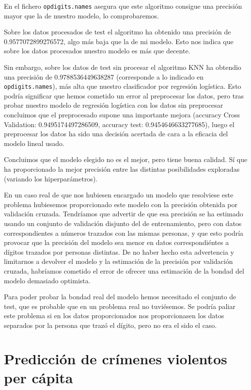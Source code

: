 \documentclass[a4]{article}
\begin{document}
En el fichero \texttt{opdigits.names} asegura que este algoritmo
consigue una precisión mayor que la de nuestro modelo, lo
comprobaremos.

Sobre los datos procesados de test el algoritmo ha obtenido una
precisión de 0.9577072899276572, algo más baja que la de mi modelo.
Esto nos indica que sobre los datos procesados nuestro modelo es más
que decente.

Sin embargo, sobre los datos de test sin procesar el algoritmo KNN ha
obtendio una precisión de 0.9788536449638287 (corresponde a lo
indicado en \texttt{opdigits.names}), más alta que nuestro
clasificador por regresión logística. Esto podría significar que hemos
cometido un error al preprocesar los datos, pero tras probar nuestro
modelo de regresión logística con los datos sin preprocesar concluimos
que el preprocesado supone una importante mejora (accuracy Cross
Validation: 0.9495174497286509, accuracy test: 0.9454646633277685),
luego el preprocesar los datos ha sido una decisión acertada de cara a
la eficacia del modelo lineal usado.

Concluimos que el modelo elegido no es el mejor, pero tiene buena
calidad. Sí que ha proporcionado la mejor precisión entre las
distintas posibilidades exploradas (variando los hiperparámetros).

En un caso real de que nos hubiesen encargado un modelo que resolviese
este problema hubiesemos proporcionado este modelo con la precisión
obtenida por validación cruzada. Tendríamos que advertir de que esa
precisión se ha estimado usando un conjunto de validación disjunto del
de entrenamiento, pero con datos correspondientes a números trazados
con las mismas personas, y que esto podría provocar que la precisión
del modelo sea menor en datos correspondiéntes a dígitos trazados por
personas distintas. De no haber hecho esta advertencia y limitarnos a
devolver el modelo y la estimación de la precisión por validación
cruzada, habríamos cometido el error de ofrecer una estimación de la
bondad del modelo demasiado optimista.

Para poder probar la bondad real del modelo hemos necesitado el
conjunto de test, que es probable que en un problema real no
tuviésemos. Se podría paliar este problema si en los datos
proporcionados nos proporcionasen los datos separados por la
persona que trazó el dígito, pero no era el sido el caso.

\section{Predicción de crímenes violentos per cápita}
\end{document}

